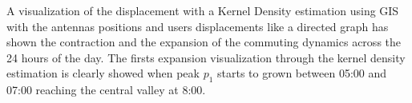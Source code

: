 A visualization of the displacement with a Kernel Density estimation using GIS with the antennas positions and users displacements like a directed graph has shown the contraction and the expansion of the commuting dynamics across the 24 hours of the day. The firsts expansion visualization through the kernel density estimation is clearly showed when peak $p_1$ starts to grown between 05:00 and 07:00 reaching the central valley at 8:00.

\newpage

\begin{figure}
\centering
{}
\end{figure}
